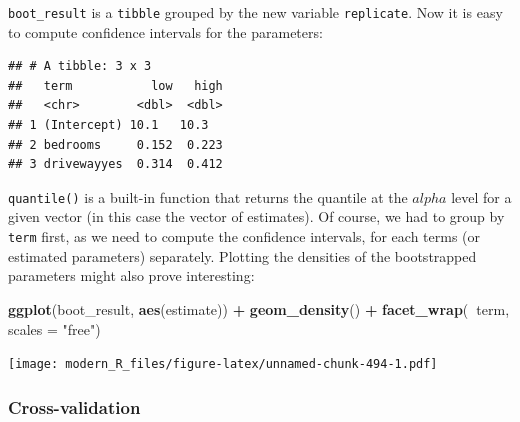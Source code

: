 \documentclass[]{gitbook}
\newenvironment{Shaded}{\begin{snugshade}}{\end{snugshade}}
\newcommand{\DataTypeTok}[1]{\textcolor[rgb]{0.13,0.29,0.53}{#1}}
\newcommand{\DecValTok}[1]{\textcolor[rgb]{0.00,0.00,0.81}{#1}}
\newcommand{\FloatTok}[1]{\textcolor[rgb]{0.00,0.00,0.81}{#1}}
\newcommand{\KeywordTok}[1]{\textcolor[rgb]{0.13,0.29,0.53}{\textbf{#1}}}
\newcommand{\NormalTok}[1]{#1}
\newcommand{\OperatorTok}[1]{\textcolor[rgb]{0.81,0.36,0.00}{\textbf{#1}}}
\newcommand{\StringTok}[1]{\textcolor[rgb]{0.31,0.60,0.02}{#1}}
\theoremstyle{definition}
\theoremstyle{definition}
\theoremstyle{definition}
\theoremstyle{remark}
\begin{document}
\texttt{boot\_result} is a \texttt{tibble} grouped by the new variable
\texttt{replicate}. Now it is easy to compute confidence intervals for
the parameters:

\begin{Shaded}
\end{Shaded}

\begin{verbatim}
## # A tibble: 3 x 3
##   term           low   high
##   <chr>        <dbl>  <dbl>
## 1 (Intercept) 10.1   10.3  
## 2 bedrooms     0.152  0.223
## 3 drivewayyes  0.314  0.412
\end{verbatim}

\texttt{quantile()} is a built-in function that returns the quantile at
the \(alpha\) level for a given vector (in this case the vector of
estimates). Of course, we had to group by \texttt{term} first, as we
need to compute the confidence intervals, for each terms (or estimated
parameters) separately. Plotting the densities of the bootstrapped
parameters might also prove interesting:

\begin{Shaded}
\begin{Highlighting}[]
\KeywordTok{ggplot}\NormalTok{(boot_result, }\KeywordTok{aes}\NormalTok{(estimate)) }\OperatorTok{+}
\StringTok{  }\KeywordTok{geom_density}\NormalTok{() }\OperatorTok{+}
\StringTok{  }\KeywordTok{facet_wrap}\NormalTok{(}\OperatorTok{~}\NormalTok{term, }\DataTypeTok{scales =} \StringTok{"free"}\NormalTok{)}
\end{Highlighting}
\end{Shaded}

\texttt{[image: modern\_R\_files/figure-latex/unnamed-chunk-494-1.pdf]}

\hypertarget{cross-validation}{%
\subsubsection{Cross-validation}\label{cross-validation}}
\end{document}
